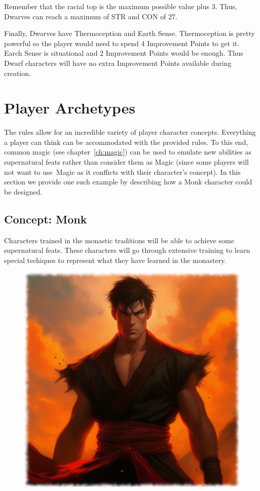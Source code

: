 Remember that the racial top is the maximum possible value plus 3. Thus, Dwarves can reach a maximum of STR and CON of 27.

Finally, Dwarves have Thermoception and Earth Sense. Thermoception is pretty powerful so the player would need to spend 4 Improvement Points to get it. Earch Sense is situational and 2 Improvement Points would be enough. Thus Dwarf characters will have no extra Improvement Points available during creation.



\section{Player Archetypes}

The rules allow for an incredible variety of player character concepts. Everything a player can think can be accommodated with the provided rules. To this end, common magic (see chapter~\ref{ch:magic}) can be used to emulate new abilities as supernatural feats rather than consider them as Magic (since some players will not want to use Magic as it conflicts with their character's concept). In this section we provide one such example by describing how a Monk character could be designed.

\subsection{Concept: Monk}
Characters trained in the monastic traditions will be able to achieve some supernatural feats. These characters will go through extensive training to learn special techiques to represent what they have learned in the monastery.

\begin{figure}[H]
\begin{center}
\includegraphics[scale=0.24]{img/ai-images/monk.png}
\end{center}
\end{figure}

